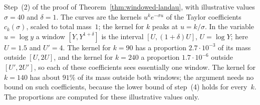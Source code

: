 {
}%
\ifdim\wd0>\linewidth\resizebox{\linewidth}{!}{\box0}%
\else\leavevmode\box0\fi
\caption{Step~(2) of the proof of Theorem~\ref{thm:windowed-landau}, with
illustrative values $\sigma=40$ and $\delta=1$. The curves are the
kernels $u^ke^{-\sigma u}$ of the Taylor coefficients $c_k(\sigma)$,
scaled to total mass~$1$; the kernel for $k$ peaks at $u=k/\sigma$. In
the variable $u=\log y$ a window $[Y,Y^{1+\delta}]$ is the interval
$[U,(1+\delta)U]$, $U=\log Y$; here $U=1.5$ and $U'=4$. The kernel for
$k=90$ has a proportion $2.7\cdot10^{-3}$ of its mass outside $[U,2U]$,
and the kernel for $k=240$ a proportion $1.7\cdot10^{-6}$ outside
$[U',2U']$, so each of these coefficients sees essentially one window.
The kernel for $k=140$ has about $91\%$ of its mass outside both
windows; the argument needs no bound on such coefficients, because the
lower bound of step~(4) holds for every~$k$. The proportions are computed
for these illustrative values only.}
\label{fig:gamma-kernel}
